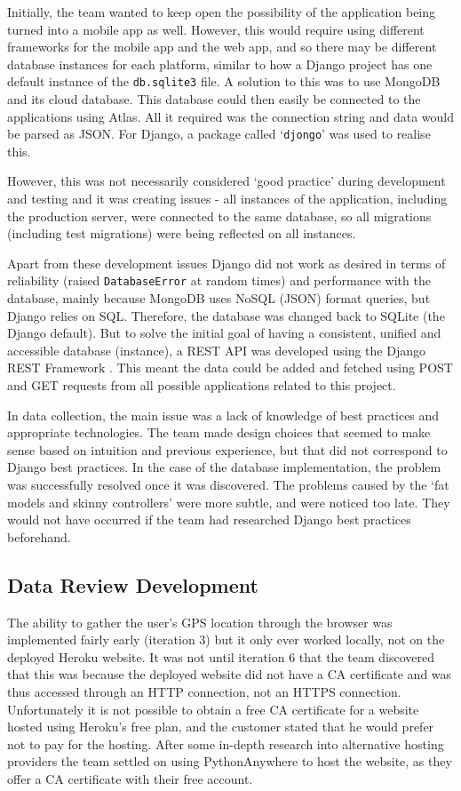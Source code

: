 \documentclass{l3proj}
\begin{document}
Initially, the team wanted to keep open the possibility of the application being turned into a mobile app as well. However, this would require using different frameworks for the mobile app and the web app, and so there may be different database instances for each platform, similar to how a Django project has one default instance of the \texttt{db.sqlite3} file. A solution to this was to use MongoDB and its cloud database. This database could then easily be connected to the applications using Atlas. All it required was the connection string and data would be parsed as JSON. For Django, a package called `\texttt{djongo}' was used to realise this.

However, this was not necessarily considered `good practice' during development and testing and it was creating issues - all instances of the application, including the production server, were connected to the same database, so all migrations (including test migrations) were being reflected on all instances.

Apart from these development issues Django did not work as desired in terms of reliability (raised \texttt{DatabaseError} at random times) and performance with the database, mainly because MongoDB uses NoSQL (JSON) format queries, but Django relies on SQL. Therefore, the database was changed back to SQLite (the Django default). But to solve the initial goal of having a consistent, unified and accessible database (instance), a REST API was developed using the Django REST Framework \cite{DRF}. This meant the data could be added and fetched using POST and GET requests from all possible applications related to this project.

In data collection, the main issue was a lack of knowledge of best practices and appropriate technologies. The team made design choices that seemed to make sense based on intuition and previous experience, but that did not correspond to Django best practices. In the case of the database implementation, the problem was successfully resolved once it was discovered. The problems caused by the `fat models and skinny controllers' were more subtle, and were noticed too late. They would not have occurred if the team had researched Django best practices beforehand.


\subsection{Data Review Development}
\label{subsec:datarev}
The ability to gather the user's GPS location through the browser was implemented fairly early (iteration 3) but it only ever worked locally, not on the deployed Heroku website. It was not until iteration 6 that the team discovered that this was because the deployed website did not have a CA certificate and was thus accessed through an HTTP connection, not an HTTPS connection. Unfortunately it is not possible to obtain a free CA certificate for a website hosted using Heroku's free plan, and the customer stated that he would prefer not to pay for the hosting. After some in-depth research into alternative hosting providers the team settled on using PythonAnywhere to host the website, as they offer a CA certificate with their free account. 
\end{document}
